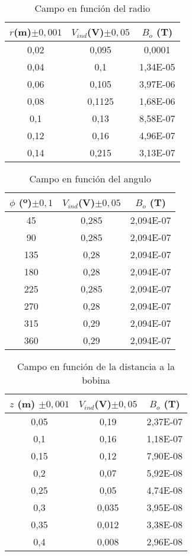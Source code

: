 \documentclass[a4paper,12pt,spanish]{article}
\begin{document}
\begin{table}[H]
	\centering
	\begin{tabular}{|c|c|c|}
		\hline
		$r$(m)$\pm0,001$ & $V_{ind}$(V)$\pm0,05$   & $B_o$ (T)                  \\ \hline
		0,02  & 0,095  & 0,0001 \\ \hline
		0,04  & 0,1    & 1,34E-05 \\ \hline
		0,06  & 0,105  & 3,97E-06 \\ \hline
		0,08  & 0,1125 & 1,68E-06 \\ \hline
		0,1   & 0,13   & 8,58E-07 \\ \hline
		0,12  & 0,16   & 4,96E-07 \\ \hline
		0,14  & 0,215  & 3,13E-07 \\ \hline
	\end{tabular}
	\caption{Campo en función del radio}
\end{table}


\begin{table}[H]
	\centering
	\begin{tabular}{|c|c|c|}
		\hline
		$\phi$ (º)$\pm0,1$ & $V_{ind}$(V)$\pm0,05$   & $B_o$ (T)                  \\ \hline
		45    & 0,285 & 2,094E-07 \\ \hline
		90    & 0,285 & 2,094E-07 \\ \hline
		135   & 0,28  & 2,094E-07 \\ \hline
		180   & 0,28  & 2,094E-07 \\ \hline
		225   & 0,285 & 2,094E-07 \\ \hline
		270   & 0,28  & 2,094E-07 \\ \hline
		315   & 0,29  & 2,094E-07 \\ \hline
		360   & 0,29  & 2,094E-07 \\ \hline
	\end{tabular}
	\caption{Campo en función del angulo}
\end{table}

\begin{table}[H]
	\centering
	\begin{tabular}{|c|c|c|}
		\hline
		$z$ (m) $\pm0,001$& $V_{ind}$(V)$\pm0,05$  & $B_o$ (T)                   \\ \hline
		0,05  & 0,19  & 2,37E-07 \\ \hline
		0,1   & 0,16  & 1,18E-07  \\ \hline
		0,15  & 0,12  & 7,90E-08 \\ \hline
		0,2   & 0,07  & 5,92E-08 \\ \hline
		0,25  & 0,05  & 4,74E-08 \\ \hline
		0,3   & 0,035 & 3,95E-08 \\ \hline
		0,35  & 0,012 & 3,38E-08 \\ \hline
		0,4   & 0,008 & 2,96E-08 \\ \hline
	\end{tabular}
	\caption{Campo en función de la distancia a la bobina}
\end{table}
\end{document}
